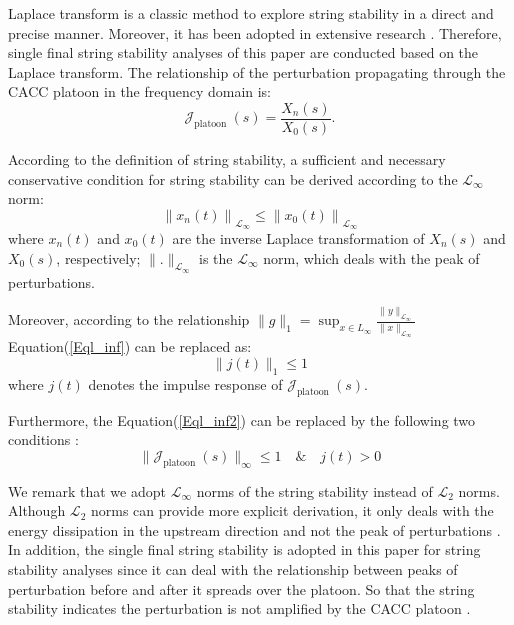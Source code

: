 \documentclass[trsc,nonblindrev]{informs3} %
\begin{document}
Laplace transform is a classic method to explore string stability in a direct and precise manner. Moreover, it has been adopted in extensive research \citep{orosz2011delayed,montanino2021string,feng2019string}. Therefore, single final string stability analyses of this paper are conducted based on the Laplace transform. The relationship of the perturbation propagating through the CACC platoon in the frequency domain is:
\begin{equation}
    \mathcal{J}_{\text {platoon }}(s)=\frac{X_{n}(s)}{X_{0}(s)}.
\end{equation}

According to the definition of string stability, a sufficient and necessary conservative condition for string stability can be derived according to the $\mathcal{L}_{\infty}$ norm:
\begin{equation}
    \left\|x_{n}(t)\right\|_{\mathcal{L}_{\infty}} \leq \left\|x_{0}(t)\right\|_{\mathcal{L}_{\infty}}
    \label{Eql_inf}
\end{equation}
where $x_{n}(t)$ and $x_{0}(t)$ are the inverse Laplace transformation of $X_{n}(s)$ and $X_{0}(s)$, respectively; $\|.\|_{\mathcal{L}_{\infty}}$ is the $\mathcal{L}_{\infty}$ norm, which deals with the peak of perturbations.

Moreover, according to the relationship $\|g\|_{1}=\sup _{x \in L_{\infty}} \frac{\|y\|_{\mathcal{L}_{\infty}}}{\|x\|_{\mathcal{L}_{\infty}}}$ Equation(\ref{Eql_inf}) can be replaced as:
\begin{equation}
    \|j\left(t\right)\|_{1}\leq 1
    \label{Eql_inf2}
\end{equation}
where $j\left(t\right)$ denotes the impulse response of $\mathcal{J}_{\text {platoon }}(s)$.

Furthermore, the Equation(\ref{Eql_inf2}) can be replaced by the following two conditions \citep{Swaroop1994}:
\begin{equation}
    \|\mathcal{J}_{\text {platoon }}(s)\|_{\infty} \leq 1 \quad \& \quad j\left(t\right)>0
    \label{Eql_inf3}
\end{equation}

We remark that we adopt $\mathcal{L}_{\infty}$ norms of the string stability instead of $\mathcal{L}_{2}$ norms. Although $\mathcal{L}_{2}$ norms can provide more explicit derivation, it only deals with the energy dissipation in the upstream direction and not the peak of perturbations \citep{Darbha2003}. In addition, the single final string stability is adopted in this paper for string stability analyses since it can deal with the relationship between peaks of perturbation before and after it spreads over the platoon. So that the string stability indicates the perturbation is not amplified by the CACC platoon \citep{Studli2017}.
\end{document}
